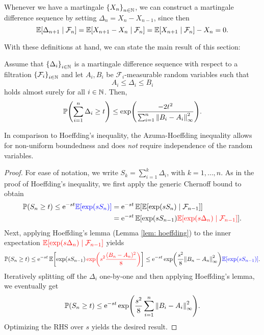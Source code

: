 Whenever we have a martingale $\set{X_n}_{n \in \N}$, we can construct a martingale difference sequence by setting $\Delta_n = X_n - X_{n-1}$, since then
\[
    \operatorname{\mathbb{E}}[\Delta_{n+1} \mathrel{|} \mathcal{F}_n] = \operatorname{\mathbb{E}}[X_{n+1} - X_n \mathrel{|} \mathcal{F}_n] = \operatorname{\mathbb{E}}[X_{n+1} \mathrel{|} \mathcal{F}_n] - X_n = 0.
\]

With these definitions at hand, we can state the main result of this section:

\begin{theorem}
\label{thm: azuma-hoeffding}
Assume that $\set{\Delta_i}_{i \in \N}$ is a martingale difference sequence with respect to a filtration $\set{\mathcal{F}_i}_{i \in \N}$ and let $A_i, B_i$ be $\mathcal{F}_i$-measurable random variables such that
\[
    A_i \leq \Delta_i \leq B_i
\]
holds almost surely for all $i \in \mathbb{N}$. Then,
\[
    \Prob\left(\sum_{i=1}^n \Delta_i \geq t\right) \leq \exp(\frac{-2t^2}{\sum_{i=1}^n \norm{B_i - A_i}_{\infty}^2}).
\]
\end{theorem}

In comparison to Hoeffding’s inequality, the Azuma-Hoeffding inequality allows for non-uniform boundedness and does \emph{not} require independence of the random variables.

\begin{proof}
For ease of notation, we write $S_k = \sum_{i=1}^k \Delta_i$, with $k = 1, \dots, n$. As in the proof of Hoeffding's inequality, we first apply the generic Chernoff bound to obtain
\begin{align*}
    \operatorname{\mathbb{P}}(S_n \geq t) \leq \mathrm{e}^{-st} {\color{blue} \operatorname{\mathbb{E}}[\exp(s S_n)]} &= \mathrm{e}^{-st} \operatorname{\mathbb{E}}[\operatorname{\mathbb{E}}[\exp(s S_n) \mathrel{|} \mathcal{F}_{n-1}]] \\
    &= \mathrm{e}^{-st} \operatorname{\mathbb{E}}[\exp(s S_{n-1}) {\color{red} \operatorname{\mathbb{E}}[\exp(s \Delta_n) \mathrel{|} \mathcal{F}_{n-1}]}].
\end{align*}
Next, applying Hoeffding's lemma (Lemma \ref{lem: hoeffding}) to the inner expectation ${\color{red} \operatorname{\mathbb{E}}[\exp(s \Delta_n) \mathrel{|} \mathcal{F}_{n-1}]}$ yields
\[
    \Prob(S_n \geq t) \leq \e^{-st} \Exp\left[\exp(s S_{n-1}) \, {\color{red} \exp(s^2 \frac{(B_n - A_n)^2}{8})}\right] \leq \e^{-st} \exp(\frac{s^2}{8} \norm{B_n - A_n}_{\infty}^2) {\color{blue} \Exp[\exp(s S_{n-1})]}.
\]
Iteratively splitting off the $\Delta_i$ one-by-one and then applying Hoeffding's lemma, we eventually get
\[
    \operatorname{\mathbb{P}}(S_n \geq t) \leq \mathrm{e}^{-st} \exp(\frac{s^2}{8} \sum_{i=1}^n \norm{B_i - A_i}_{\infty}^2).
\]
Optimizing the RHS over $s$ yields the desired result.
\end{proof}
